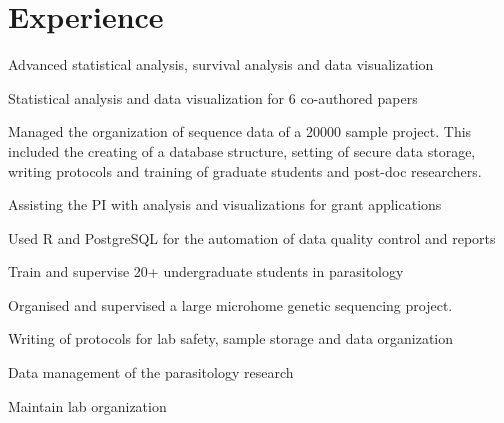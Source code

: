 \documentclass[letterpaper]{deedy-resume} %
\begin{document}
\hfill
%
%
\begin{minipage}[t]{0.66\textwidth} %


\section{Experience}

\vspace{\topsep} %
\begin{tightitemize}
\item Advanced statistical analysis, survival analysis and data visualization
\item Statistical analysis and data visualization for 6 co-authored papers
\item Managed the organization of sequence data of a 20000 sample project. This included the creating of a database structure, setting of secure data storage, writing protocols and training of graduate students and post-doc researchers.
\item Assisting the PI with analysis and visualizations for grant applications
\item Used R and PostgreSQL for the automation of data quality control and reports
\end{tightitemize}

\sectionspace %

\begin{tightitemize}
\item Train and supervise 20+ undergraduate students in parasitology
\item Organised and supervised a large microhome genetic sequencing project.
\item Writing of protocols for lab safety, sample storage and data organization
\item Data management of the parasitology research
\item Maintain lab organization
\end{tightitemize}


\end{minipage}
\end{document}
